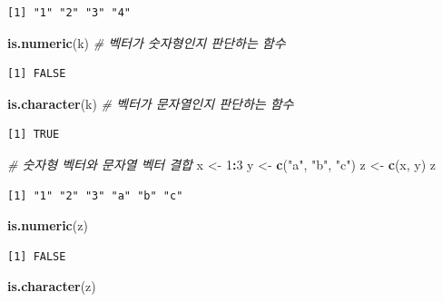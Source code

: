 \documentclass[
  11pt,
]{krantz}
\newenvironment{Shaded}{\begin{snugshade}}{\end{snugshade}}
\newcommand{\CommentTok}[1]{\textcolor[rgb]{0.37,0.37,0.37}{\textit{#1}}}
\newcommand{\DecValTok}[1]{\textcolor[rgb]{0.06,0.06,0.06}{#1}}
\newcommand{\KeywordTok}[1]{\textcolor[rgb]{0.27,0.27,0.27}{\textbf{#1}}}
\newcommand{\NormalTok}[1]{#1}
\newcommand{\OperatorTok}[1]{\textcolor[rgb]{0.43,0.43,0.43}{\textbf{#1}}}
\newcommand{\StringTok}[1]{\textcolor[rgb]{0.5,0.5,0.5}{#1}}
\begin{document}
\begin{verbatim}
[1] "1" "2" "3" "4"
\end{verbatim}

\begin{Shaded}
\begin{Highlighting}[]
\KeywordTok{is.numeric}\NormalTok{(k) }\CommentTok{# 벡터가 숫자형인지 판단하는 함수}
\end{Highlighting}
\end{Shaded}

\begin{verbatim}
[1] FALSE
\end{verbatim}

\begin{Shaded}
\begin{Highlighting}[]
\KeywordTok{is.character}\NormalTok{(k) }\CommentTok{# 벡터가 문자열인지 판단하는 함수}
\end{Highlighting}
\end{Shaded}

\begin{verbatim}
[1] TRUE
\end{verbatim}

\begin{Shaded}
\begin{Highlighting}[]
\CommentTok{# 숫자형 벡터와 문자열 벡터 결합}
\NormalTok{x <-}\StringTok{ }\DecValTok{1}\OperatorTok{:}\DecValTok{3}
\NormalTok{y <-}\StringTok{ }\KeywordTok{c}\NormalTok{(}\StringTok{"a"}\NormalTok{, }\StringTok{"b"}\NormalTok{, }\StringTok{"c"}\NormalTok{)}
\NormalTok{z <-}\StringTok{ }\KeywordTok{c}\NormalTok{(x, y)}
\NormalTok{z}
\end{Highlighting}
\end{Shaded}

\begin{verbatim}
[1] "1" "2" "3" "a" "b" "c"
\end{verbatim}

\begin{Shaded}
\begin{Highlighting}[]
\KeywordTok{is.numeric}\NormalTok{(z)}
\end{Highlighting}
\end{Shaded}

\begin{verbatim}
[1] FALSE
\end{verbatim}

\begin{Shaded}
\begin{Highlighting}[]
\KeywordTok{is.character}\NormalTok{(z)}
\end{Highlighting}
\end{Shaded}
\end{document}

